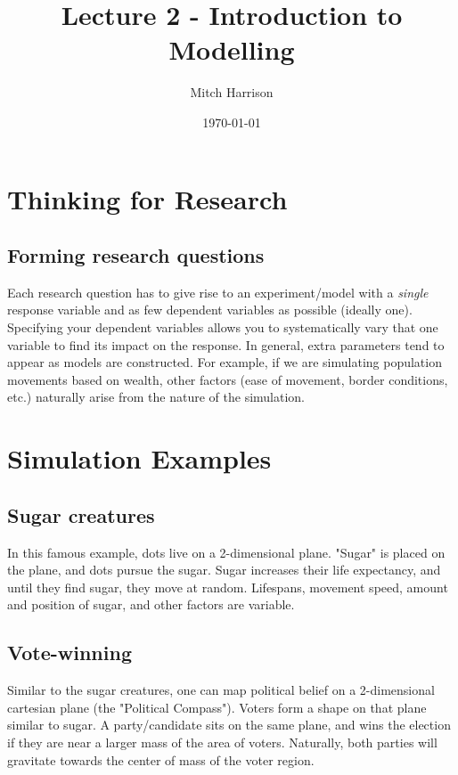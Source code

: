 \documentclass[titlepage, 12pt, leqno]{article}
\title{\Huge{Lecture 2 - Introduction to Modelling}}
\author{\large{Mitch Harrison}}
\date{\today}
\begin{document}
\setlength{\parskip}{1\baselineskip}
\setlength{\parindent}{15pt}
\maketitle
\tableofcontents
\newpage


\section{Thinking for Research}
\subsection{Forming research questions}
Each research question has to give rise to an experiment/model with a 
\textit{single} response variable and as few dependent variables as possible
(ideally one). Specifying your dependent variables allows you to systematically
vary that one variable to find its impact on the response. In general, extra
parameters tend to appear as models are constructed. For example, if we are
simulating population movements based on wealth, other factors (ease of movement,
border conditions, etc.) naturally arise from the nature of the simulation.

\pagebreak
\section{Simulation Examples}
\subsection{Sugar creatures}
In this famous example, dots live on a 2-dimensional plane. "Sugar" is placed on
the plane, and dots pursue the sugar. Sugar increases their life expectancy, and 
until they find sugar, they move at random. Lifespans, movement speed, amount and
position of sugar, and other factors are variable. 

\subsection{Vote-winning}
Similar to the sugar creatures, one can map political belief on a 2-dimensional
cartesian plane (the "Political Compass"). Voters form a shape on that plane 
similar to sugar. A party/candidate sits on the same plane, and wins the
election if they are near a larger mass of the area of voters. Naturally, 
both parties will gravitate towards the center of mass of the voter region. 
\end{document}
